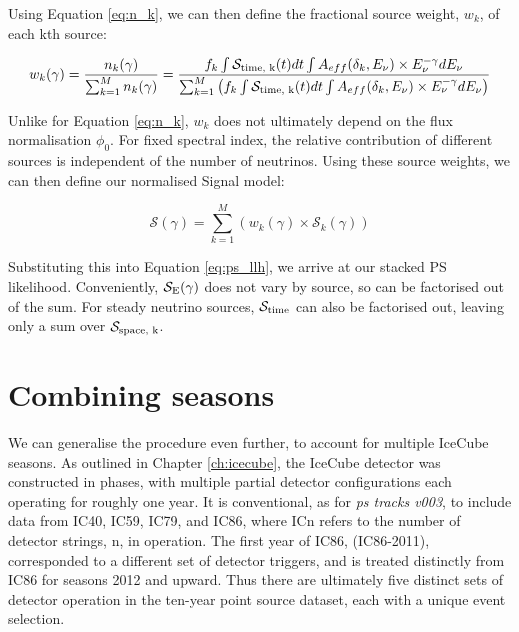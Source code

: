 Using Equation \ref{eq:n_k}, we can then define the fractional source weight, $w_{k}$, of each kth source:

\begin{equation}
w_{k}(\gamma)  = \frac{n_{k}(\gamma) }{\sum^{M}_{k=1} n_{k}(\gamma) } = \frac{f_{k} \int \mathcal{S}_{\textup{time, k}}(t) dt \int A_{eff}(\delta_{k}, E_{\nu}) \times E_{\nu}^{-\gamma} dE_{\nu}}{\sum^{M}_{k=1} \left( f_{k} \int \mathcal{S}_{\textup{time, k}}(t) dt \int A_{eff}(\delta_{k}, E_{\nu}) \times E_{\nu}^{-\gamma} dE_{\nu} \right)}
\end{equation}

Unlike for Equation \ref{eq:n_k}, $w_{k}$ does not ultimately depend on the flux normalisation $\phi_{0}$. For fixed spectral index, the relative contribution of different sources is independent of the number of neutrinos. Using these source weights, we can then define our normalised Signal model:

\begin{equation}
\mathcal{S}(\gamma) = \sum^{M}_{k=1} \left( w_{k}(\gamma)  \times \mathcal{S}_{k}(\gamma)  \right)
\label{eq:S_stacked}
\end{equation}

Substituting this into Equation \ref{eq:ps_llh}, we arrive at our stacked PS likelihood. Conveniently, $\mathcal{S}_{\textup{E}}(\gamma)$ does not vary by source, so can be factorised out of the sum. For steady neutrino sources, $\mathcal{S}_{\textup{time}}$ can also be factorised out, leaving only a sum over $\mathcal{S}_{\textup{space, k}}$.

\section{Combining seasons}

We can generalise the procedure even further, to account for multiple IceCube seasons. As outlined in Chapter \ref{ch:icecube}, the IceCube detector was constructed in phases, with multiple partial detector configurations each operating for roughly one year. It is conventional, as for \emph{ps tracks v003}, to include data from IC40, IC59, IC79, and IC86, where ICn refers to the number of detector strings, n,  in operation. The first year of IC86, (IC86-2011), corresponded to a different set of detector triggers, and is treated distinctly from IC86 for seasons 2012 and upward. Thus there are ultimately five distinct sets of detector operation in the ten-year point source dataset, each with a unique event selection.

